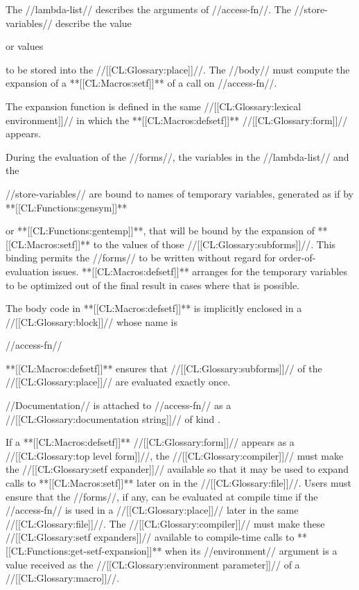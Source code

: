 The //lambda-list// describes the arguments of //access-fn//. The //store-variables// describe the value

or values

to be stored into the //[[CL:Glossary:place]]//. The //body// must compute the expansion of a **[[CL:Macros:setf]]** of a call on //access-fn//.

The expansion function is defined in the same //[[CL:Glossary:lexical environment]]// in which the **[[CL:Macros:defsetf]]** //[[CL:Glossary:form]]// appears.

During the evaluation of the //forms//, the variables in the //lambda-list// and the

//store-variables// are bound to names of temporary variables, generated as if by **[[CL:Functions:gensym]]**

or **[[CL:Functions:gentemp]]**, that will be bound by the expansion of **[[CL:Macros:setf]]** to the values of those //[[CL:Glossary:subforms]]//. This binding permits the //forms// to be written without regard for order-of-evaluation issues. **[[CL:Macros:defsetf]]** arranges for the temporary variables to be optimized out of the final result in cases where that is possible.

The body code in **[[CL:Macros:defsetf]]** is implicitly enclosed in a //[[CL:Glossary:block]]// whose name is

//access-fn//

**[[CL:Macros:defsetf]]** ensures that //[[CL:Glossary:subforms]]// of the //[[CL:Glossary:place]]// are evaluated exactly once.

//Documentation// is attached to //access-fn// as a //[[CL:Glossary:documentation string]]// of kind .

If a **[[CL:Macros:defsetf]]** //[[CL:Glossary:form]]// appears as a //[[CL:Glossary:top level form]]//, the //[[CL:Glossary:compiler]]// must make the //[[CL:Glossary:setf expander]]// available so that it may be used to expand calls to **[[CL:Macros:setf]]** later on in the //[[CL:Glossary:file]]//. Users must ensure that the //forms//, if any, can be evaluated at compile time if the //access-fn// is used in a //[[CL:Glossary:place]]// later in the same //[[CL:Glossary:file]]//. The //[[CL:Glossary:compiler]]// must make these //[[CL:Glossary:setf expanders]]// available to compile-time calls to **[[CL:Functions:get-setf-expansion]]** when its //environment// argument is a value received as the //[[CL:Glossary:environment parameter]]// of a //[[CL:Glossary:macro]]//.

